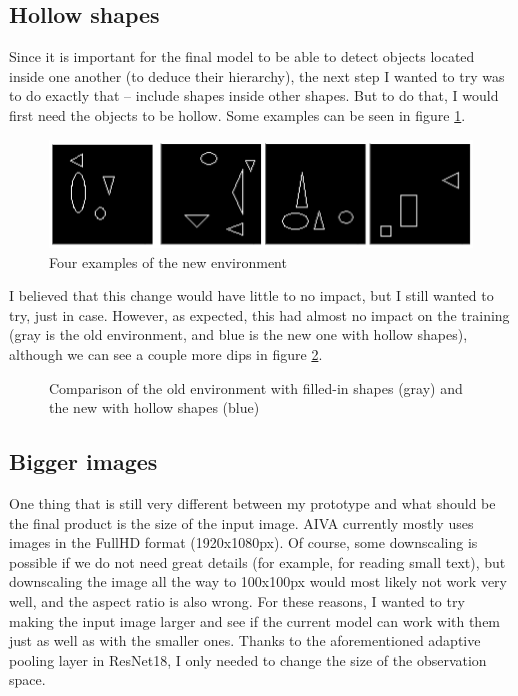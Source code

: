 \documentclass[
  digital,     %
  oneside,     %
  nosansbold,  %
  nocolorbold, %
  lof,         %
  lot,         %
]{fithesis4}
\begin{document}
\subsection{Hollow shapes}
Since it is important for the final model to be able to detect objects located inside one another (to deduce their hierarchy), the next step I wanted to try was to do exactly that -- include shapes inside other shapes. But to do that, I would first need the objects to be hollow. Some examples can be seen in figure \ref{fig:env5}.

\begin{figure}
    \centering
    \includegraphics[width=1\linewidth]{env_examples/env5.png}
    \caption{Four examples of the new environment}
    \label{fig:env5}
\end{figure}
 
I believed that this change would have little to no impact, but I still wanted to try, just in case. However, as expected, this had almost no impact on the training (gray is the old environment, and blue is the new one with hollow shapes), although we can see a couple more dips in figure \ref{fig:v5}.

\begin{figure}
    \centering
    \makebox[\textwidth][c]{}
    \caption{Comparison of the old environment with filled-in shapes (gray) and the new with hollow shapes (blue)}
    \label{fig:v5}
\end{figure}

\subsection{Bigger images}
One thing that is still very different between my prototype and what should be the final product is the size of the input image. AIVA currently mostly uses images in the FullHD format (1920x1080px). Of course, some downscaling is possible if we do not need great details (for example, for reading small text), but downscaling the image all the way to 100x100px would most likely not work very well, and the aspect ratio is also wrong. For these reasons, I wanted to try making the input image larger and see if the current model can work with them just as well as with the smaller ones. Thanks to the aforementioned adaptive pooling layer in ResNet18, I only needed to change the size of the observation space.
\end{document}
